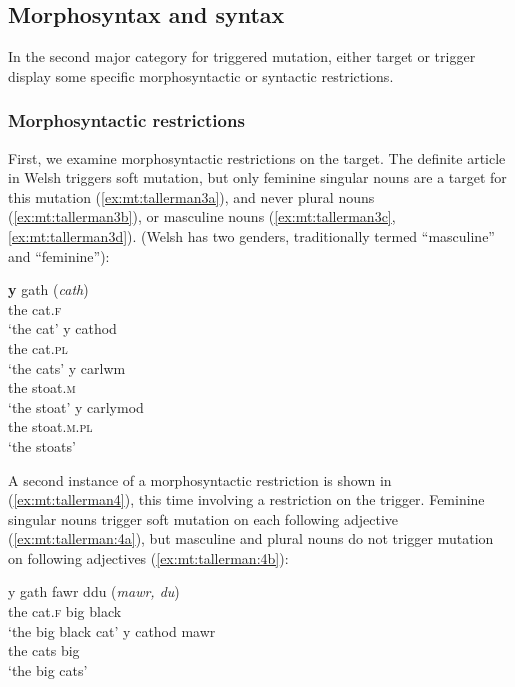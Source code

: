 \documentclass[output=paper,colorlinks,citecolor=brown]{langscibook}
\begin{document}
\subsection{Morphosyntax and syntax}

In the second major category for triggered mutation, either target or trigger display some specific morphosyntactic or syntactic restrictions. 


\subsubsection{Morphosyntactic restrictions}

First, we examine morphosyntactic restrictions on the target. The definite article in Welsh triggers soft mutation, but only feminine singular nouns are a target for this mutation (\ref{ex:mt:tallerman3a}), and never plural nouns (\ref{ex:mt:tallerman3b}), or masculine nouns (\ref{ex:mt:tallerman3c}, \ref{ex:mt:tallerman3d}). (Welsh has two genders, traditionally termed “masculine” and “feminine”):

\ea\label{ex:mt:tallerman3}
\ea\label{ex:mt:tallerman3a}
\gll \textbf{y} gath    (\textit{cath})\\
the cat.\textsc{f}\\
\glt ‘the cat’
\ex\label{ex:mt:tallerman3b}
\gll y cathod\\
the cat.\textsc{pl}\\
\glt ‘the cats’
\ex\label{ex:mt:tallerman3c}
\gll y carlwm\\
the stoat.\textsc{m}\\
\glt ‘the stoat’   
\ex\label{ex:mt:tallerman3d}
\gll y carlymod\\
the stoat.\textsc{m.pl}\\
\glt ‘the stoats’
\z
\z

A second instance of a morphosyntactic restriction is shown in (\ref{ex:mt:tallerman4}), this time involving a restriction on the trigger. Feminine singular nouns trigger soft mutation on each following adjective (\ref{ex:mt:tallerman:4a}), but masculine and plural nouns do not trigger mutation on following adjectives  (\ref{ex:mt:tallerman:4b}):

\ea\label{ex:mt:tallerman4}
\ea\label{ex:mt:tallerman:4a}
\gll y gath fawr ddu    (\textit{mawr, du})\\
the cat.\textsc{f} big black\\
\glt ‘the big black cat’ 
\ex\label{ex:mt:tallerman:4b}
\gll y cathod mawr\\
the cats big\\
\glt ‘the big cats’
\z
\z
\end{document}
